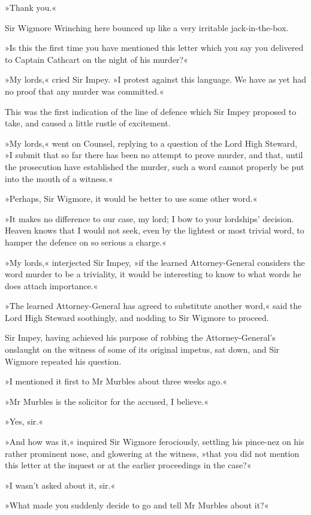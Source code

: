 »Thank you.«

Sir Wigmore Wrinching here bounced up like a very irritable jack-in-the-box.

»Is this the first time you have mentioned this letter which you say you delivered to Captain Cathcart on the night of his murder?«

»My lords,« cried Sir Impey. »I protest against this language. We have as yet had no proof that any murder was committed.«

This was the first indication of the line of defence which Sir Impey proposed to take, and caused a little rustle of excitement.

»My lords,« went on Counsel, replying to a question of the Lord High Steward, »I submit that so far there has been no attempt to prove murder, and that, until the prosecution have established the murder, such a word cannot properly be put into the mouth of a witness.«

»Perhaps, Sir Wigmore, it would be better to use some other word.«

»It makes no difference to our case, my lord; I bow to your lordships' decision. Heaven knows that I would not seek, even by the lightest or most trivial word, to hamper the defence on so serious a charge.«

»My lords,« interjected Sir Impey, »if the learned Attorney-General considers the word murder to be a triviality, it would be interesting to know to what words he does attach importance.«

»The learned Attorney-General has agreed to substitute another word,« said the Lord High Steward soothingly, and nodding to Sir Wigmore to proceed.

Sir Impey, having achieved his purpose of robbing the Attorney-General's onslaught on the witness of some of its original impetus, sat down, and Sir Wigmore repeated his question.

»I mentioned it first to Mr Murbles about three weeks ago.«

»Mr Murbles is the solicitor for the accused, I believe.«

»Yes, sir.«

»And how was it,« inquired Sir Wigmore ferociously, settling his pince-nez on his rather prominent nose, and glowering at the witness, »that you did not mention this letter at the inquest or at the earlier proceedings in the case?«

»I wasn't asked about it, sir.«

»What made you suddenly decide to go and tell Mr Murbles about it?«

